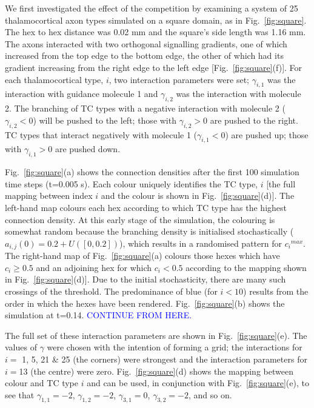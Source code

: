 \documentclass[a4paper,11pt]{article}
\newcommand{\cmnt}[1]{\textcolor{blue}{#1}}
\begin{document}
We first investigated the effect of the competition by examining a system of
25 thalamocortical axon types simulated on a square domain, as in
Fig.~\ref{fig:square}. The hex to hex distance was 0.02 mm and the
square's side length was 1.16 mm. The axons interacted with two orthogonal
signalling gradients, one of which increased from the top edge to the bottom
edge, the other of which had its gradient increasing from the right edge to
the left edge [Fig.~\ref{fig:square}(f)]. For each thalamocortical type, $i$,
two interaction parameters were set; $\gamma_{i,1}$ was the interaction with
guidance molecule 1 and $\gamma_{i,2}$ was the interaction with molecule
2. The branching of TC types with a negative interaction with molecule 2
($\gamma_{i,2}<0$) will be pushed to the left; those with $\gamma_{i,2}>0$ are
pushed to the right. TC types that interact negatively with molecule 1
($\gamma_{i,1}<0$) are pushed up; those with $\gamma_{i,1}>0$ are pushed down.

Fig.~\ref{fig:square}(a) shows the connection densities after the first 100
simulation time steps (t=0.005 s). Each colour uniquely identifies the TC
type, $i$ [the full mapping between index $i$ and the colour is shown in
  Fig.~\ref{fig:square}(d)]. The left-hand map colours each hex according to
which TC type has the highest connection density. At this early stage of the
simulation, the colouring is somewhat random because the branching density is
initialised stochastically ($a_{i,j}(0) = 0.2 + U([0,0.2])$), which results in
a randomised pattern for ${c_i}^{max}$. The right-hand map of
Fig.~\ref{fig:square}(a) colours those hexes which have $c_i \geq 0.5$ and an
adjoining hex for which $c_i < 0.5$ according to the mapping shown in
Fig.~\ref{fig:square}(d)]. Due to the initial stochasticity, there are many
  such crossings of the threshold. The predominance of blue (for $i<10$)
  results from the order in which the hexes have been rendered.
Fig.~\ref{fig:square}(b) shows the simulation at t=0.14. \cmnt{CONTINUE FROM HERE.}

The full set of these interaction parameters are shown in
Fig.~\ref{fig:square}(e). The values of $\gamma$ were chosen with the
intention of forming a grid; the interactions for $i =$ 1, 5, 21 \& 25 (the
corners) were strongest and the interaction parameters for $i=$13 (the centre)
were zero. Fig.~\ref{fig:square}(d) shows the mapping between colour and TC
type $i$ and can be used, in conjunction with Fig.~\ref{fig:square}(e), to see
that $\gamma_{1,1}=-2$, $\gamma_{1,2}=-2$, $\gamma_{3,1}=0$,
$\gamma_{3,2}=-2$, and so on.
\end{document}
